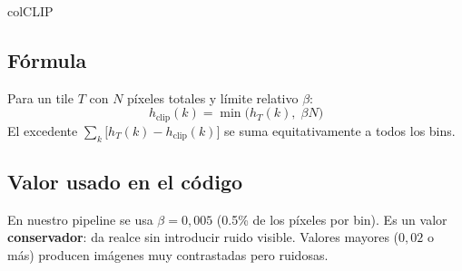 \documentclass[11pt,a4paper]{article}
\begin{document}
\begin{keybox}{colCLIP}
\subsection*{Fórmula}

Para un tile \(T\) con \(N\) píxeles totales y límite relativo \(\beta\):
\begin{equation}
    h_{\text{clip}}(k) = \min\!\bigl(h_T(k),\; \beta N\bigr)
\end{equation}
El excedente \(\sum_k \bigl[h_T(k) - h_{\text{clip}}(k)\bigr]\) se suma
equitativamente a todos los bins.

\subsection*{Valor usado en el código}

En nuestro pipeline se usa \(\beta = 0{,}005\) (0.5\% de los píxeles por bin).
Es un valor \textbf{conservador}: da realce sin introducir ruido visible.
Valores mayores (\(0{,}02\) o más) producen imágenes muy contrastadas pero
ruidosas.

\end{keybox}

\end{document}
